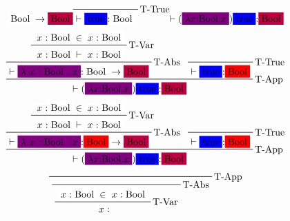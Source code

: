 \begin{frame}[c]
\begin{overprint}
\[{{        \highlight[white]{\text{Bool}} \rightarrow
        \highlight[purple]{\text{Bool}}
      }
    }
    {\prftree[r]{T-True}
      {}
      {\vdash
        \highlight[blue]{\text{true}} {:}
        \highlight[white]{\text{Bool}}
      }
    }
    {\vdash
      (\highlight[violet]{\lambda x {:} \text{Bool} . x})
      \highlight[blue]{\text{true}} {:}
      \highlight[purple]{\text{Bool}}
    }
    \]
     \[
    \prftree[r]{T-App}
    {\prftree[r]{T-Abs}
      {\prftree[r]{T-Var}
        {
          \highlight[white]{x} {:}
          \highlight[white]{\text{Bool}} \in
          \highlight[white]{x} {:}
          \highlight[white]{\text{Bool}}
        }
        {
          \highlight[white]{x} {:}
          \highlight[white]{\text{Bool}} \vdash
          \highlight[white]{x} {:}
          \highlight[white]{\text{Bool}}
        }
      }
      {\vdash
        \highlight[violet]{\lambda~{x}~{:}~{\text{Bool}}~.~{x}} {:}
        \highlight[white]{\text{Bool}} \rightarrow
        \highlight[purple]{\text{Bool}}
      }
    }
    {\prftree[r]{T-True}
      {}
      {\vdash
        \highlight[blue]{\text{true}} {:}
        \highlight[red]{\text{Bool}}
      }
    }
    {\vdash
      (\highlight[violet]{\lambda x {:} \text{Bool} . x})
      \highlight[blue]{\text{true}} {:}
      \highlight[purple]{\text{Bool}}
    }
    \]
     \[
    \prftree[r]{T-App}
    {\prftree[r]{T-Abs}
      {\prftree[r]{T-Var}
        {
          \highlight[white]{x} {:}
          \highlight[white]{\text{Bool}} \in
          \highlight[white]{x} {:}
          \highlight[white]{\text{Bool}}
        }
        {
          \highlight[white]{x} {:}
          \highlight[white]{\text{Bool}} \vdash
          \highlight[white]{x} {:}
          \highlight[white]{\text{Bool}}
        }
      }
      {\vdash
        \highlight[violet]{\lambda~{x}~{:}~{\text{Bool}}~.~{x}} {:}
        \highlight[red]{\text{Bool}} \rightarrow
        \highlight[purple]{\text{Bool}}
      }
    }
    {\prftree[r]{T-True}
      {}
      {\vdash
        \highlight[blue]{\text{true}} {:}
        \highlight[red]{\text{Bool}}
      }
    }
    {\vdash
      (\highlight[violet]{\lambda x {:} \text{Bool} . x})
      \highlight[blue]{\text{true}} {:}
      \highlight[purple]{\text{Bool}}
    }
    \]
     \[
    \prftree[r]{T-App}
    {\prftree[r]{T-Abs}
      {\prftree[r]{T-Var}
        {
          \highlight[white]{x} {:}
          \highlight[white]{\text{Bool}} \in
          \highlight[white]{x} {:}
          \highlight[white]{\text{Bool}}
        }
        {
          \highlight[white]{x} {:}
}}}\]
\end{overprint}
\end{frame}
